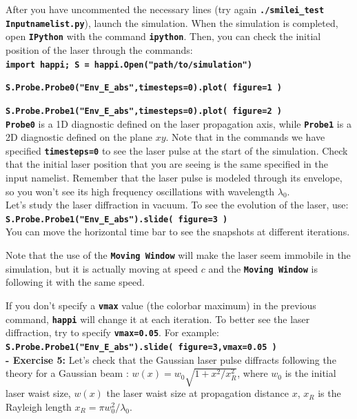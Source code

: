 \documentclass[a4paper,12pt]{extarticle}
\newcommand{\commandline}[1]{\texttt{\textbf{#1}}}
\begin{document}
After you have uncommented the necessary lines (try again \commandline{./smilei\_test Inputnamelist.py}), launch the simulation.  When the simulation is completed, open \commandline{IPython} with the command \commandline{ipython}. Then, you can check the initial position of the laser through the commands:\\

\commandline{import happi; S =  happi.Open("path/to/simulation")}

\commandline{S.Probe.Probe0("Env\_E\_abs",timesteps=0).plot( figure=1 )}

\commandline{S.Probe.Probe1("Env\_E\_abs",timesteps=0).plot( figure=2 )}\\

\commandline{Probe0} is a 1D diagnostic defined on the laser propagation axis, while \commandline{Probe1} is a 2D diagnostic defined on the plane $xy$.  Note that in the commands we have specified \commandline{timesteps=0} to see the laser pulse at the start of the simulation. Check that the initial laser position that you are seeing is the same specified in the input namelist. Remember that the laser pulse is modeled through its envelope, so you won't see its high frequency oscillations with wavelength $\lambda_0$.\\

Let's study the laser diffraction in vacuum. To see the evolution of the laser, use:\\ 

\commandline{S.Probe.Probe1("Env\_E\_abs").slide( figure=3 )}\\

You can move the horizontal time bar to see the snapshots at different iterations.

Note that the use of the \commandline{Moving Window} will make the laser seem immobile in the simulation, but it is actually moving at speed $c$ and the \commandline{Moving Window} is following it with the same speed.

If you don't specify a \commandline{vmax} value (the colorbar maximum) in the previous command, \commandline{happi} will change it at each iteration. To better see the laser diffraction, try to specify \commandline{vmax=0.05}. For example:\\

\commandline{S.Probe.Probe1("Env\_E\_abs").slide( figure=3,vmax=0.05 )}\\

\textbf{ - Exercise  5:} Let's check that the Gaussian laser pulse diffracts following the theory for a Gaussian beam \cite{siegman86}: $w(x)=w_0\sqrt{1+x^2/x_R^2}$, where $w_0$ is the initial laser waist size, $w(x)$ the laser waist size at propagation distance $x$, $x_R$ is the Rayleigh length $x_R=\pi w_0^2/\lambda_0$. 
\end{document}
